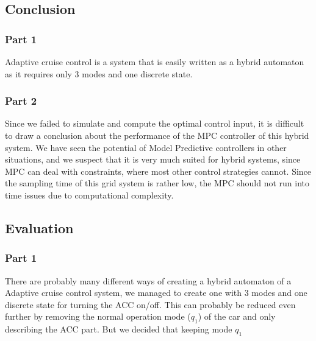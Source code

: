 \subsection*{Conclusion}
\subsubsection*{Part 1}
Adaptive cruise control is a system that is easily written as a hybrid automaton as it requires only 3 modes and one discrete state. 



\subsubsection*{Part 2}
Since we failed to simulate and compute the optimal control input, it is difficult to draw a conclusion about the performance of the MPC controller of this hybrid system. We have seen the potential of Model Predictive controllers in other situations, and we suspect that it is very much suited for hybrid systems, since MPC can deal with constraints, where most other control strategies cannot. Since the sampling time of this grid system is rather low, the MPC should not run into time issues due to computational complexity.

\subsection*{Evaluation}
\subsubsection*{Part 1}
There are probably many different ways of creating a hybrid automaton of a Adaptive cruise control system, we managed to create one with 3 modes and one discrete state for turning the ACC on/off. This can probably be reduced even further by removing the normal operation mode ($q_1$) of the car and only describing the ACC part. But we decided that keeping mode $q_1$ 

